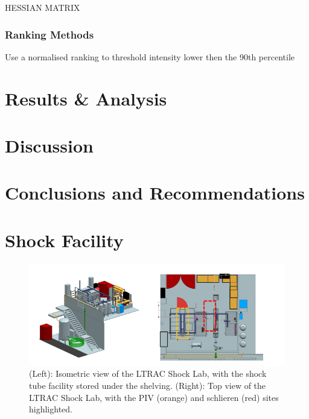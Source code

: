 HESSIAN MATRIX

\subsubsection{Ranking Methods}
Use a normalised ranking to threshold intensity lower then the 90th percentile 

\newpage
\section{Results \& Analysis}

\newpage
\section{Discussion}

\newpage
\section{Conclusions and Recommendations}

\newpage



\normalsize
\newpage

\appendix
{}

\section{Shock Facility} \label{app:facility}

\begin{figure}[H] 
	\centering
	\includegraphics[width=1\textwidth]{fig10.PNG} 
	\caption{(Left): Isometric view of the LTRAC Shock Lab, with the shock tube facility stored under the
		shelving. (Right): Top view of the LTRAC Shock Lab, with the PIV (orange) and schlieren (red) sites
		highlighted.}
	\label{fig:10}
\end{figure}


